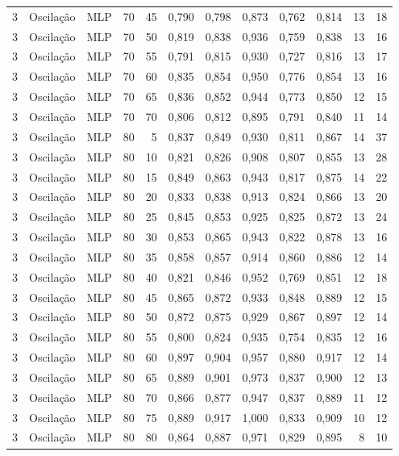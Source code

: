 \begin{longtable}{@{}rllrrrrrrrrr@{}}
3 & Oscilação & MLP & 70 & 45 & 0,790 & 0,798 & 0,873 & 0,762 & 0,814 & 13 & 18 \\
3 & Oscilação & MLP & 70 & 50 & 0,819 & 0,838 & 0,936 & 0,759 & 0,838 & 13 & 16 \\
3 & Oscilação & MLP & 70 & 55 & 0,791 & 0,815 & 0,930 & 0,727 & 0,816 & 13 & 17 \\
3 & Oscilação & MLP & 70 & 60 & 0,835 & 0,854 & 0,950 & 0,776 & 0,854 & 13 & 16 \\
3 & Oscilação & MLP & 70 & 65 & 0,836 & 0,852 & 0,944 & 0,773 & 0,850 & 12 & 15 \\
3 & Oscilação & MLP & 70 & 70 & 0,806 & 0,812 & 0,895 & 0,791 & 0,840 & 11 & 14 \\
3 & Oscilação & MLP & 80 & 5 & 0,837 & 0,849 & 0,930 & 0,811 & 0,867 & 14 & 37 \\
3 & Oscilação & MLP & 80 & 10 & 0,821 & 0,826 & 0,908 & 0,807 & 0,855 & 13 & 28 \\
3 & Oscilação & MLP & 80 & 15 & 0,849 & 0,863 & 0,943 & 0,817 & 0,875 & 14 & 22 \\
3 & Oscilação & MLP & 80 & 20 & 0,833 & 0,838 & 0,913 & 0,824 & 0,866 & 13 & 20 \\
3 & Oscilação & MLP & 80 & 25 & 0,845 & 0,853 & 0,925 & 0,825 & 0,872 & 13 & 24 \\
3 & Oscilação & MLP & 80 & 30 & 0,853 & 0,865 & 0,943 & 0,822 & 0,878 & 13 & 16 \\
3 & Oscilação & MLP & 80 & 35 & 0,858 & 0,857 & 0,914 & 0,860 & 0,886 & 12 & 14 \\
3 & Oscilação & MLP & 80 & 40 & 0,821 & 0,846 & 0,952 & 0,769 & 0,851 & 12 & 18 \\
3 & Oscilação & MLP & 80 & 45 & 0,865 & 0,872 & 0,933 & 0,848 & 0,889 & 12 & 15 \\
3 & Oscilação & MLP & 80 & 50 & 0,872 & 0,875 & 0,929 & 0,867 & 0,897 & 12 & 14 \\
3 & Oscilação & MLP & 80 & 55 & 0,800 & 0,824 & 0,935 & 0,754 & 0,835 & 12 & 16 \\
3 & Oscilação & MLP & 80 & 60 & 0,897 & 0,904 & 0,957 & 0,880 & 0,917 & 12 & 14 \\
3 & Oscilação & MLP & 80 & 65 & 0,889 & 0,901 & 0,973 & 0,837 & 0,900 & 12 & 13 \\
3 & Oscilação & MLP & 80 & 70 & 0,866 & 0,877 & 0,947 & 0,837 & 0,889 & 11 & 12 \\
3 & Oscilação & MLP & 80 & 75 & 0,889 & 0,917 & 1,000 & 0,833 & 0,909 & 10 & 12 \\
3 & Oscilação & MLP & 80 & 80 & 0,864 & 0,887 & 0,971 & 0,829 & 0,895 & 8 & 10 \\

\end{longtable}
